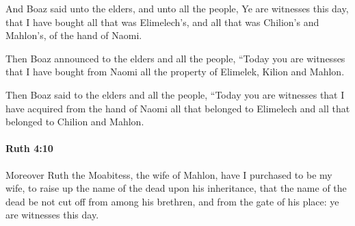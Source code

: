 			\begin{versebox}
					\item[BHS] 
					\item[LXX] 
					\item[ASV] And Boaz said unto the elders, and unto all the people, Ye are witnesses this day, that I have bought all that was Elimelech's, and all that was Chilion's and Mahlon's, of the hand of Naomi.
					\item[NIV] Then Boaz announced to the elders and all the people, “Today you are witnesses that I have bought from Naomi all the property of Elimelek, Kilion and Mahlon.
					\item[NRSV] Then Boaz said to the elders and all the people, “Today you are witnesses that I have acquired from the hand of Naomi all that belonged to Elimelech and all that belonged to Chilion and Mahlon.
			\end{versebox}

		\paragraph{Ruth 4:10} %
			\label{RUTH-4-10}

			Moreover Ruth the Moabitess, the wife of Mahlon, have I purchased to be my wife, to raise up the name of the dead upon his inheritance, that the name of the dead be not cut off from among his brethren, and from the gate of his place: ye are witnesses this day.

